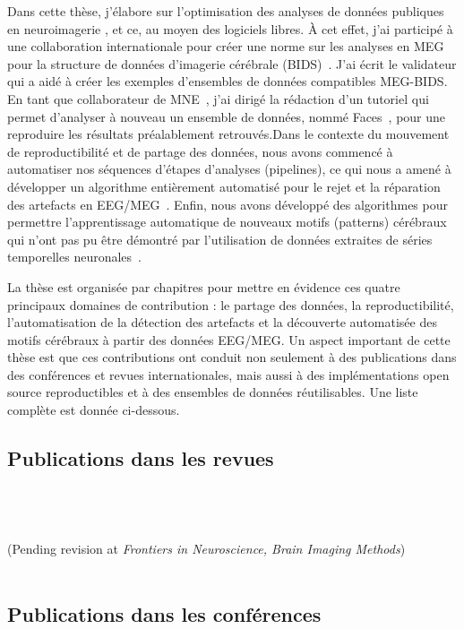 Dans cette thèse, j’élabore sur l’optimisation des analyses  de données publiques en  neuroimagerie , et ce, au moyen des logiciels libres. À cet effet, j'ai participé à une collaboration internationale pour créer une norme sur les analyses en MEG pour la structure de données d'imagerie cérébrale (BIDS)~\citep{niso2018meg}. J'ai écrit le validateur qui a aidé à créer les exemples d'ensembles de données compatibles MEG-BIDS. En tant que collaborateur de MNE~\citep{gramfort2013meg}, j'ai dirigé la rédaction d'un tutoriel qui permet d’analyser à nouveau un ensemble de données, nommé Faces~\citep{wakeman2015multi}, pour une reproduire les résultats préalablement retrouvés.Dans le contexte du mouvement de reproductibilité et de partage des données, nous avons commencé à automatiser nos séquences d’étapes d’analyses (pipelines), ce qui nous a amené à développer un algorithme entièrement automatisé pour le rejet et la réparation des artefacts en EEG/MEG~\citep{jas2016automated, jas2017autoreject}. Enfin, nous avons développé des algorithmes pour permettre l’apprentissage automatique de nouveaux motifs (patterns) cérébraux qui n’ont pas pu être démontré  par l’utilisation de données extraites de séries temporelles neuronales~\citep{jas2017learning}. 

La thèse est organisée par chapitres pour mettre en évidence ces quatre principaux domaines de contribution : le partage des données, la reproductibilité, l'automatisation de la détection des artefacts et la découverte automatisée des motifs cérébraux à partir des données EEG/MEG. Un aspect important de cette thèse est que ces contributions ont conduit non seulement à des publications dans des conférences et revues internationales, mais aussi à des implémentations open source reproductibles et à des ensembles de données réutilisables. Une liste complète est donnée ci-dessous.

\subsection*{Publications dans les revues}
\ \\ \\
\ \\ (Pending revision at \emph{Frontiers in Neuroscience, Brain Imaging Methods})\ \\ \\

\subsection*{Publications dans les conférences}
\ \\ \\


